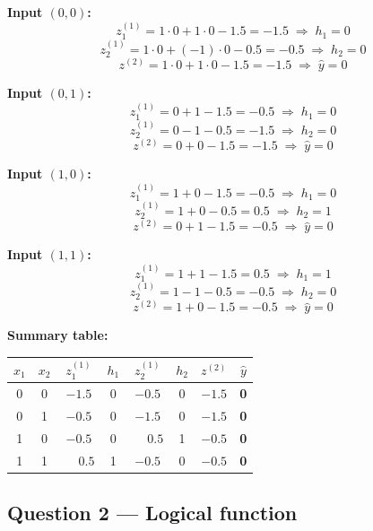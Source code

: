 \documentclass[11pt, a4paper]{article}
\begin{document}
\vspace{0.8em}

\textbf{Input $(0, 0)$:}
\[
  z_1^{(1)} = 1\cdot0 + 1\cdot0 - 1.5 = -1.5 \;\Rightarrow\; h_1 = 0
\]
\[
  z_2^{(1)} = 1\cdot0 + (-1)\cdot0 - 0.5 = -0.5 \;\Rightarrow\; h_2 = 0
\]
\[
  z^{(2)} = 1\cdot0 + 1\cdot0 - 1.5 = -1.5 \;\Rightarrow\; \hat{y} = 0
\]

\textbf{Input $(0, 1)$:}
\[
  z_1^{(1)} = 0 + 1 - 1.5 = -0.5 \;\Rightarrow\; h_1 = 0
\]
\[
  z_2^{(1)} = 0 - 1 - 0.5 = -1.5 \;\Rightarrow\; h_2 = 0
\]
\[
  z^{(2)} = 0 + 0 - 1.5 = -1.5 \;\Rightarrow\; \hat{y} = 0
\]

\textbf{Input $(1, 0)$:}
\[
  z_1^{(1)} = 1 + 0 - 1.5 = -0.5 \;\Rightarrow\; h_1 = 0
\]
\[
  z_2^{(1)} = 1 + 0 - 0.5 = 0.5 \;\Rightarrow\; h_2 = 1
\]
\[
  z^{(2)} = 0 + 1 - 1.5 = -0.5 \;\Rightarrow\; \hat{y} = 0
\]

\textbf{Input $(1, 1)$:}
\[
  z_1^{(1)} = 1 + 1 - 1.5 = 0.5 \;\Rightarrow\; h_1 = 1
\]
\[
  z_2^{(1)} = 1 - 1 - 0.5 = -0.5 \;\Rightarrow\; h_2 = 0
\]
\[
  z^{(2)} = 1 + 0 - 1.5 = -0.5 \;\Rightarrow\; \hat{y} = 0
\]

\vspace{0.5em}

\textbf{Summary table:}

\begin{center}
\renewcommand{\arraystretch}{1.6}
\begin{tabular}{cc|cc|cc|cc}
\toprule
$x_1$ & $x_2$ & $z_1^{(1)}$ & $h_1$ & $z_2^{(1)}$ & $h_2$ & $z^{(2)}$ & $\hat{y}$ \\
\midrule
0 & 0 & $-1.5$ & 0 & $-0.5$ & 0 & $-1.5$ & \textbf{0} \\
0 & 1 & $-0.5$ & 0 & $-1.5$ & 0 & $-1.5$ & \textbf{0} \\
1 & 0 & $-0.5$ & 0 & $\phantom{-}0.5$ & 1 & $-0.5$ & \textbf{0} \\
1 & 1 & $\phantom{-}0.5$ & 1 & $-0.5$ & 0 & $-0.5$ & \textbf{0} \\
\bottomrule
\end{tabular}
\end{center}

\subsection*{Question 2 — Logical function}
\end{document}
